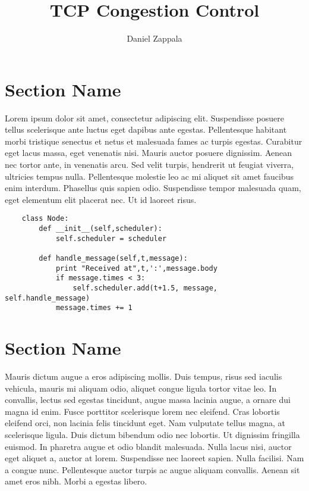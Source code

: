 \documentclass[fleqn,11pt]{article}
\begin{document}
	
	\lstset{
	  language=Python,
	  basicstyle=\small,          %
	  keywordstyle=\bfseries,
	  identifierstyle=,           %
	  commentstyle=,              %
	  stringstyle=\ttfamily,      %
	  showstringspaces=false,     %
	  numbers=left,
	  numberstyle=\tiny,
	  numbersep=5pt,
	  frame=tb,
	}
	
	\title{TCP Congestion Control}
	
	\author{Daniel Zappala}
	
	\date{}
	
	\maketitle
	
	\section{Section Name}
	
	Lorem ipsum dolor sit amet, consectetur adipiscing elit. Suspendisse
	posuere tellus scelerisque ante luctus eget dapibus ante
	egestas. Pellentesque habitant morbi tristique senectus et netus et
	malesuada fames ac turpis egestas. Curabitur eget lacus massa, eget
	venenatis nisi. Mauris auctor posuere dignissim. Aenean nec tortor
	ante, in venenatis arcu. Sed velit turpis, hendrerit ut feugiat
	viverra, ultricies tempus nulla. Pellentesque molestie leo ac mi
	aliquet sit amet faucibus enim interdum. Phasellus quis sapien
	odio. Suspendisse tempor malesuada quam, eget elementum elit placerat
	nec. Ut id laoreet risus.
	
	\begin{lstlisting}
	class Node:
		def __init__(self,scheduler):
			self.scheduler = scheduler
	
		def handle_message(self,t,message):
			print "Received at",t,':',message.body
			if message.times < 3:
				self.scheduler.add(t+1.5, message, self.handle_message)
			message.times += 1
	\end{lstlisting}
	
	\section{Section Name}
	
	Mauris dictum augue a eros adipiscing mollis. Duis tempus, risus sed
	iaculis vehicula, mauris mi aliquam odio, aliquet congue ligula tortor
	vitae leo. In convallis, lectus sed egestas tincidunt, augue massa
	lacinia augue, a ornare dui magna id enim. Fusce porttitor scelerisque
	lorem nec eleifend. Cras lobortis eleifend orci, non lacinia felis
	tincidunt eget. Nam vulputate tellus magna, at scelerisque
	ligula. Duis dictum bibendum odio nec lobortis. Ut dignissim fringilla
	euismod. In pharetra augue et odio blandit malesuada. Nulla lacus
	nisi, auctor eget aliquet a, auctor at lorem. Suspendisse nec laoreet
	sapien. Nulla facilisi. Nam a congue nunc. Pellentesque auctor turpis
	ac augue aliquam convallis. Aenean sit amet eros nibh. Morbi a egestas
	libero.
	
\end{document}
